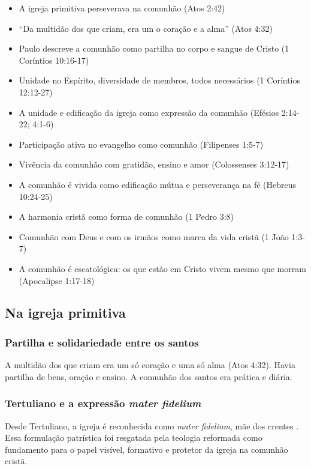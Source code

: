 \begin{itemize}
\item A igreja primitiva perseverava na comunhão (Atos 2:42)
\item ``Da multidão dos que criam, era um o coração e a alma'' (Atos 4:32)
\item Paulo descreve a comunhão como partilha no corpo e sangue de Cristo (1 Coríntios 10:16-17)
\item Unidade no Espírito, diversidade de membros, todos necessários (1 Coríntios 12:12-27)
\item A unidade e edificação da igreja como expressão da comunhão (Efésios 2:14-22; 4:1-6)
\item Participação ativa no evangelho como comunhão (Filipenses 1:5-7)
\item Vivência da comunhão com gratidão, ensino e amor (Colossenses 3:12-17)
\item A comunhão é vivida como edificação mútua e perseverança na fé (Hebreus 10:24-25)
\item A harmonia cristã como forma de comunhão (1 Pedro 3:8)
\item Comunhão com Deus e com os irmãos como marca da vida cristã (1 João 1:3-7)
\item A comunhão é escatológica: os que estão em Cristo vivem mesmo que morram (Apocalipse 1:17-18)
\end{itemize}

\subsection{Na igreja primitiva}

\subsubsection{Partilha e solidariedade entre os santos}
A multidão dos que criam era um só coração e uma só alma (Atos 4:32). Havia partilha de bens, oração e ensino. A comunhão dos santos era prática e diária.

\subsubsection{Tertuliano e a expressão \textit{mater fidelium}}
Desde Tertuliano, a igreja é reconhecida como \textit{mater fidelium}, mãe dos crentes \cite{bavinck2012}. Essa formulação patrística foi resgatada pela teologia reformada como fundamento para o papel visível, formativo e protetor da igreja na comunhão cristã.

